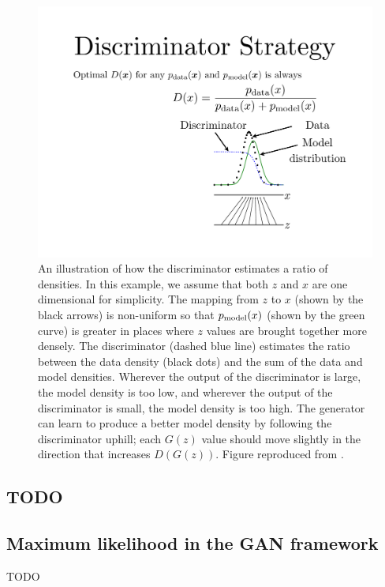 \begin{figure}
\centering
\includegraphics[width=\figwidth]{ratio}
\caption{
An illustration of how the discriminator estimates a ratio of
densities.
In this example, we assume that both $z$ and $x$ are one dimensional
for simplicity.
The mapping from $z$ to $x$ (shown by the black arrows) is non-uniform so that $p_{\rm{model}}(x)$
(shown by the green curve) is
greater in places where $z$ values are brought together more densely.
The discriminator (dashed blue line) estimates the ratio between the data density (black dots)
and the sum of the data and model densities.
Wherever the output of the discriminator is large, the model density is too low, and wherever
the output of the discriminator is small, the model density is too high.
The generator can learn to produce a better model density by following the discriminator uphill;
each $G(z)$ value should move slightly in the direction that increases $D(G(z))$.
Figure reproduced from \citet{Goodfellow-et-al-NIPS2014-small}.
}
\label{fig:ratio}
\end{figure}


\subsection{TODO}

\subsection{Maximum likelihood in the GAN framework}
\label{eq:mle_exercise}
TODO

